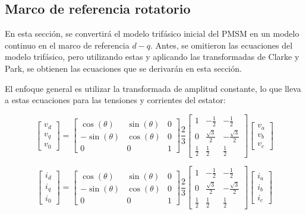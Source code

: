 \subsection{Marco de referencia rotatorio}

En esta sección, se convertirá el modelo trifásico inicial del PMSM en un modelo continuo en el marco de referencia $d - q$. Antes, se omitieron las ecuaciones del modelo trifásico, pero utilizando estas y aplicando las transformadas de Clarke y Park, se obtienen las ecuaciones que se derivarán en esta sección.

El enfoque general es utilizar la transformada de amplitud constante, lo que lleva a estas ecuaciones para las tensiones y corrientes del estator:

\begin{equation}
	\begin{bmatrix}
		v_d \\
		v_q \\
		v_0
	\end{bmatrix}
	=
	\begin{bmatrix}
		\cos(\theta) & \sin(\theta) & 0  \\
		-\sin(\theta) & \cos(\theta) & 0  \\
		0 & 0 & 1
	\end{bmatrix}
	\frac{2}{3}
	\begin{bmatrix}
		1 & -\frac{1}{2} & -\frac{1}{2} \\
		0 & \frac{\sqrt{3}}{2} & -\frac{\sqrt{3}}{2} \\
		\frac{1}{2} & \frac{1}{2} & \frac{1}{2}
	\end{bmatrix}
	\begin{bmatrix}
		v_a \\
		v_b \\
		v_c
	\end{bmatrix}
\end{equation}

\begin{equation}
	\begin{bmatrix}
		i_d \\
		i_q \\
		i_0
	\end{bmatrix}
	=
	\begin{bmatrix}
		\cos(\theta) & \sin(\theta) & 0  \\
		-\sin(\theta) & \cos(\theta) & 0  \\
		0 & 0 & 1
	\end{bmatrix}
	\frac{2}{3}
	\begin{bmatrix}
		1 & -\frac{1}{2} & -\frac{1}{2} \\
		0 & \frac{\sqrt{3}}{2} & -\frac{\sqrt{3}}{2} \\
		\frac{1}{2} & \frac{1}{2} & \frac{1}{2}
	\end{bmatrix}
	\begin{bmatrix}
		i_a \\
		i_b \\
		i_c
	\end{bmatrix}
\end{equation}


